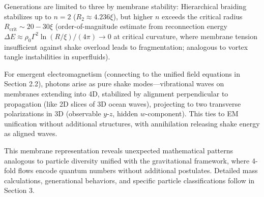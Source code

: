 Generations are limited to three by membrane stability: Hierarchical braiding stabilizes up to $n=2$ ($R_2 \approx 4.236 \xi$), but higher $n$ exceeds the critical radius $R_{\text{crit}} \sim 20-30 \xi$ (order-of-magnitude estimate from reconnection energy $\Delta E \approx \rho_0 \Gamma^2 \ln(R / \xi) / (4\pi) \to 0$ at critical curvature, where membrane tension insufficient against shake overload leads to fragmentation; analogous to vortex tangle instabilities in superfluids).

For emergent electromagnetism (connecting to the unified field equations in Section 2.2), photons arise as pure shake modes---vibrational waves on membranes extending into 4D, stabilized by alignment perpendicular to propagation (like 2D slices of 3D ocean waves), projecting to two transverse polarizations in 3D (observable $y$-$z$, hidden $w$-component). This ties to EM unification without additional structures, with annihilation releasing shake energy as aligned waves.

This membrane representation reveals unexpected mathematical patterns analogous to particle diversity unified with the gravitational framework, where 4-fold flows encode quantum numbers without additional postulates. Detailed mass calculations, generational behaviors, and specific particle classifications follow in Section 3.

\medskip
\noindent
{}
\medskip
